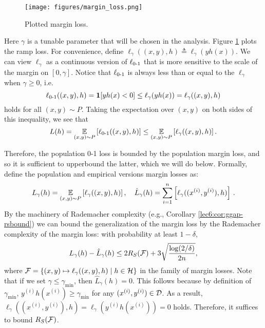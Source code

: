 \begin{figure}[ht!]
    \begin{center}
  \texttt{[image: figures/margin\_loss.png]}
  \end{center}
  \caption{Plotted margin loss.}
  \label{lec6:fig:marginloss}
\end{figure}
Here $\gamma$ is a tunable parameter that will be chosen in the analysis. Figure \ref{lec6:fig:marginloss} plots the ramp loss. For convenience, define $\ell_\gamma((x,y), h) \triangleq \ell_\gamma(yh(x))$. We can view $\ell_\gamma$ as a continuous version of $\ell_{\textup{0-1}}$ that is more sensitive to the scale of the margin on $[0,\gamma]$. Notice that $\ell_{\textup{0-1}}$ is always less than or equal to the $\ell_\gamma$ when $\gamma\geq 0$, i.e.
\begin{equation}
    \ell_{\textup{0-1}}((x,y), h) = \mathbf{1}[yh(x) < 0]\leq \ell_\gamma(yh(x)) =\ell_\gamma ((x,y), h)
\end{equation}
holds for all $(x,y)\sim P$. Taking the expectation over $(x,y)$ on both sides of this inequality, we see that
\begin{equation}
    L(h) = \operatorname*{\mathbb{E}}_{(x,y)\sim P} \left[ \ell_{\textup{0-1}}((x,y), h) \right] \leq \operatorname*{\mathbb{E}}_{(x,y)\sim P} \left[ \ell_\gamma ((x,y), h) \right].
\end{equation}

Therefore, the population 0-1 loss is bounded by the population margin loss, and so it is sufficient to upperbound the latter, which we will do below. 
Formally, define the population and empirical versions margin losses as:
\begin{equation}
L_\gamma(h) = \operatorname*{\mathbb{E}}_{(x,y)\sim P}\left[ \ell_\gamma((x,y), h)\right], \quad \hat{L}_\gamma(h) = \sum_{i=1}^n\left [\ell_\gamma((x^{(i)},y^{(i)}), h)\right]\,.
\end{equation}
By the machinery of Rademacher complexity (e.g., Corollary \ref{lec6:cor:ggap-rsbound}) we can bound the generalization of the margin loss by the Rademacher complexity of the margin loss: with probability at least $1-\delta$, 
\begin{equation}
L_\gamma(h) - \hat{L}_\gamma(h)\leq 2R_S(\mathcal F) + 3\sqrt{\frac{\log (2/\delta)}{2n}},
\end{equation}
where $\mathcal F = \{(x,y)\mapsto \ell_\gamma((x,y), h)\mid h\in\mathcal H\}$ in the family of margin losses. Note that if we set $\gamma\leq \gamma_{\min}$, then $\hat{L}_{\gamma}(h) = 0$. This follows because by definition of $\gamma_{\min}$, $y^{(i)}h(x^{(i)})\geq \gamma_{\min}$ for any $(x^{(i)}, y^{(i)})\in \mathcal D$. As a result, $\ell_\gamma((x^{(i)}, y^{(i)}), h) = \ell_\gamma(y^{(i)}h(x^{(i)})) = 0$ holds. Therefore, it suffices to bound $R_S(\mathcal F)$.

